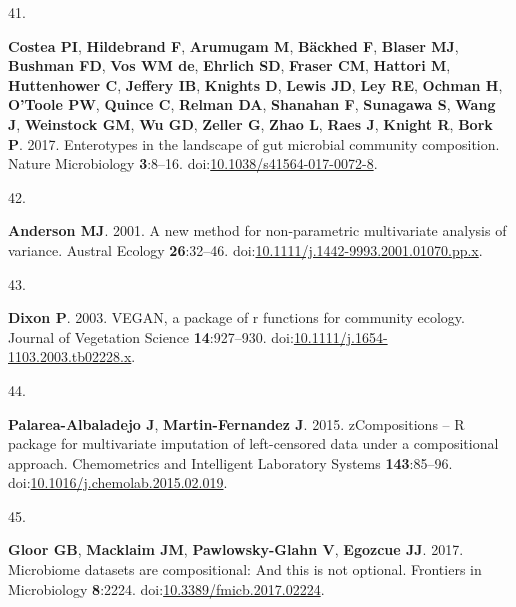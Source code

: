 \documentclass[
]{article}
\newlength{\cslhangindent}
\newlength{\csllabelwidth}
\newlength{\cslentryspacingunit} %
\newenvironment{CSLReferences}[2] %
 {%
  \setlength{\parindent}{0pt}
  \ifodd #1
  \let\oldpar\par
  \def\par{\hangindent=\cslhangindent\oldpar}
  \fi
  \setlength{\parskip}{#2\cslentryspacingunit}
 }%
 {}
\newcommand{\CSLLeftMargin}[1]{\parbox[t]{\csllabelwidth}{#1}}
\newcommand{\CSLRightInline}[1]{\parbox[t]{\linewidth - \csllabelwidth}{#1}\break}
\begin{document}
\begin{CSLReferences}{0}{1}
\leavevmode{}%
\CSLLeftMargin{41. }%
\CSLRightInline{\textbf{Costea PI}, \textbf{Hildebrand F},
\textbf{Arumugam M}, \textbf{Bäckhed F}, \textbf{Blaser MJ},
\textbf{Bushman FD}, \textbf{Vos WM de}, \textbf{Ehrlich SD},
\textbf{Fraser CM}, \textbf{Hattori M}, \textbf{Huttenhower C},
\textbf{Jeffery IB}, \textbf{Knights D}, \textbf{Lewis JD}, \textbf{Ley
RE}, \textbf{Ochman H}, \textbf{O'Toole PW}, \textbf{Quince C},
\textbf{Relman DA}, \textbf{Shanahan F}, \textbf{Sunagawa S},
\textbf{Wang J}, \textbf{Weinstock GM}, \textbf{Wu GD}, \textbf{Zeller
G}, \textbf{Zhao L}, \textbf{Raes J}, \textbf{Knight R}, \textbf{Bork
P}. 2017. Enterotypes in the landscape of gut microbial community
composition. Nature Microbiology \textbf{3}:8--16.
doi:\href{https://doi.org/10.1038/s41564-017-0072-8}{10.1038/s41564-017-0072-8}.}

\leavevmode{}%
\CSLLeftMargin{42. }%
\CSLRightInline{\textbf{Anderson MJ}. 2001. A new method for
non-parametric multivariate analysis of variance. Austral Ecology
\textbf{26}:32--46.
doi:\href{https://doi.org/10.1111/j.1442-9993.2001.01070.pp.x}{10.1111/j.1442-9993.2001.01070.pp.x}.}

\leavevmode{}%
\CSLLeftMargin{43. }%
\CSLRightInline{\textbf{Dixon P}. 2003. {VEGAN}, a package of r
functions for community ecology. Journal of Vegetation Science
\textbf{14}:927--930.
doi:\href{https://doi.org/10.1111/j.1654-1103.2003.tb02228.x}{10.1111/j.1654-1103.2003.tb02228.x}.}

\leavevmode{}%
\CSLLeftMargin{44. }%
\CSLRightInline{\textbf{Palarea-Albaladejo J}, \textbf{Martin-Fernandez
J}. 2015. zCompositions -- {R} package for multivariate imputation of
left-censored data under a compositional approach. Chemometrics and
Intelligent Laboratory Systems \textbf{143}:85--96.
doi:\href{https://doi.org/10.1016/j.chemolab.2015.02.019}{10.1016/j.chemolab.2015.02.019}.}

\leavevmode{}%
\CSLLeftMargin{45. }%
\CSLRightInline{\textbf{Gloor GB}, \textbf{Macklaim JM},
\textbf{Pawlowsky-Glahn V}, \textbf{Egozcue JJ}. 2017. Microbiome
datasets are compositional: And this is not optional. Frontiers in
Microbiology \textbf{8}:2224.
doi:\href{https://doi.org/10.3389/fmicb.2017.02224}{10.3389/fmicb.2017.02224}.}

\end{CSLReferences}
\end{document}
